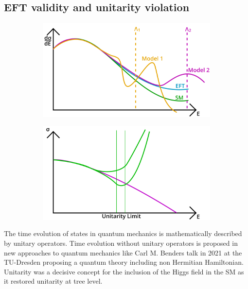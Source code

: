 \documentclass[../Bachelorarbeit.tex]{subfiles}
\begin{document}
\subsection{EFT validity and unitarity violation}
\begin{figure}[h]
    \centering
    \begin{subfigure}{0.45\textwidth}
        \centering
        \includegraphics[width=\textwidth]{images/EFT_validity.png}
        \caption{}
    \end{subfigure}
    \begin{subfigure}{0.45\textwidth}
        \centering
        \includegraphics[width=\textwidth]{images/EFT_cross_section.png}
        \caption{}
    \end{subfigure}
    \caption{}
    \label{fig:EFT_validity}
\end{figure}
The time evolution of states in quantum mechanics is mathematically described by unitary operators. Time evolution without unitary operators is proposed in new approaches to quantum mechanics like Carl M. Benders talk in 2021 at the TU-Dresden
proposing a quantum theory including non Hermitian Hamiltonian. Unitarity was a decisive concept for the inclusion of the Higgs field in the SM as it restored unitarity at tree level. 
\end{document}
